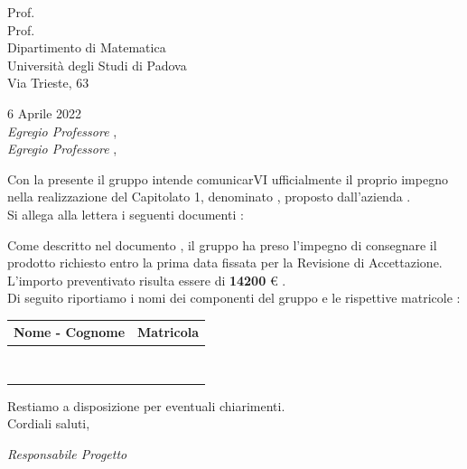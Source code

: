 	\begin{flushright}
		Prof. \Tullio					\\
		Prof. \Ric 						\\
		Dipartimento di Matematica  	\\
		Università degli Studi di Padova\\
		Via Trieste, 63					
	\end{flushright}
	
	\begin{flushleft}
		6 Aprile 2022					\\
		\textit{Egregio Professore \Tullio}, \\
		\textit{Egregio Professore \Ric}, 
	\end{flushleft}
		Con la presente il gruppo \textit{\docNomeTeam} intende comunicarVI ufficialmente il proprio impegno nella realizzazione del Capitolato 1, denominato \textit{\prog}, proposto dall'azienda \textit{\azienda}.\\
		Si allega alla lettera i seguenti documenti :
	
		\documenti
		
		Come descritto nel documento \can, il gruppo \textit{\docNomeTeam} ha preso l'impegno di consegnare il prodotto richiesto entro la prima data fissata per la Revisione di Accettazione.
		L'importo preventivato risulta essere di \textbf{14200 }€ .
		\\
		\newpage
		Di seguito riportiamo i nomi dei componenti del gruppo e le rispettive matricole :
		\begin{table}[htb]
			\centering
				\begin{tabular} { c c }
					Nome - Cognome & Matricola 		\\
					\hline \hline					\\
					\Ire 	& \MIre					\\
					\Tom 	& \MTom					\\
					\MatE 	& \MMatE				\\
					\Pie 	& \MPie					\\
					\Andre	& \MAndre				\\
					\MatP 	& \MMatP				\\
					\Sam 	& \MSam					\\
				\end{tabular}
		\end{table}
	 
		\begin{flushleft}										
			Restiamo a disposizione per eventuali chiarimenti.		\\
			Cordiali saluti,
		\end{flushleft} 
	
		\begin{flushright}
			\textit{Responsabile Progetto} \\
		\end{flushright}
	\thispagestyle{empty}   